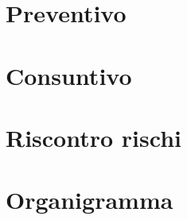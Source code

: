 \documentclass[]{article}
\begin{document}
	\newpage
	
	\newpage

	\section{Preventivo}
	
	\newpage

	\section{Consuntivo}
	
	\newpage

	\section{Riscontro rischi}
	
	\newpage

	\section{Organigramma}
	
	\newpage
\end{document}
